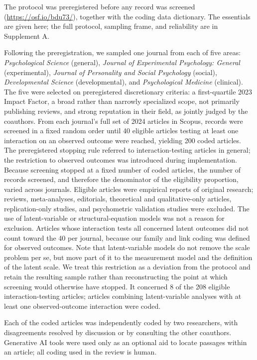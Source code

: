 \documentclass[
  man,
  floatsintext,
  longtable,
  nolmodern,
  notxfonts,
  notimes,
  colorlinks=true,linkcolor=blue,citecolor=blue,urlcolor=blue]{apa7}
\begin{document}
The protocol was preregistered before any record was screened
(\url{https://osf.io/bdu73/}), together with the coding data dictionary.
The essentials are given here; the full protocol, sampling frame, and
reliability are in Supplement A.

Following the preregistration, we sampled one journal from each of five
areas: \emph{Psychological Science} (general), \emph{Journal of
Experimental Psychology: General} (experimental), \emph{Journal of
Personality and Social Psychology} (social), \emph{Developmental
Science} (developmental), and \emph{Psychological Medicine} (clinical).
The five were selected on preregistered discretionary criteria: a
first-quartile 2023 Impact Factor, a broad rather than narrowly
specialized scope, not primarily publishing reviews, and strong
reputation in their field, as jointly judged by the coauthors. From each
journal's full set of 2024 articles in Scopus, records were screened in
a fixed random order until 40 eligible articles testing at least one
interaction on an observed outcome were reached, yielding 200 coded
articles. The preregistered stopping rule referred to
interaction-testing articles in general; the restriction to observed
outcomes was introduced during implementation. Because screening stopped
at a fixed number of coded articles, the number of records screened, and
therefore the denominator of the eligibility proportion, varied across
journals. Eligible articles were empirical reports of original research;
reviews, meta-analyses, editorials, theoretical and qualitative-only
articles, replication-only studies, and psychometric validation studies
were excluded. The use of latent-variable or structural-equation models
was not a reason for exclusion. Articles whose interaction tests all
concerned latent outcomes did not count toward the 40 per journal,
because our family and link coding was defined for observed outcomes.
Note that latent-variable models do not remove the scale problem per se,
but move part of it to the measurement model and the definition of the
latent scale. We treat this restriction as a deviation from the protocol
and retain the resulting sample rather than reconstructing the point at
which screening would otherwise have stopped. It concerned 8 of the 208
eligible interaction-testing articles; articles combining
latent-variable analyses with at least one observed-outcome interaction
were coded.

Each of the coded articles was independently coded by two researchers,
with disagreements resolved by discussion or by consulting the other
coauthors. Generative AI tools were used only as an optional aid to
locate passages within an article; all coding used in the review is
human.
\end{document}
